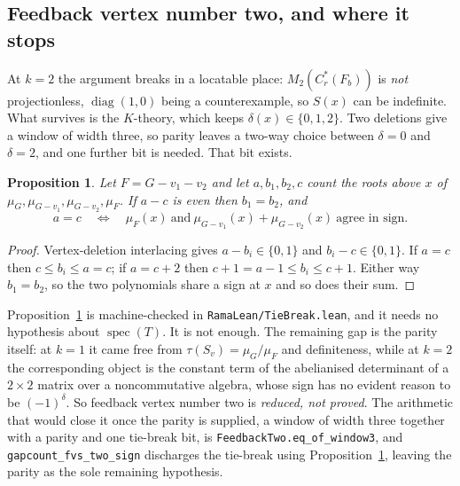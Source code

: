 \documentclass[11pt]{article}
\newtheorem{proposition}[theorem]{Proposition}
\theoremstyle{remark}
\begin{document}
\subsection{Feedback vertex number two, and where it stops}

At $k=2$ the argument breaks in a locatable place: $M_2(C^*_r(F_b))$ is \emph{not}
projectionless, $\operatorname{diag}(1,0)$ being a counterexample, so $S(x)$ can be
indefinite. What survives is the $K$-theory, which keeps $\delta(x)\in\{0,1,2\}$. Two
deletions give a window of width three, so parity leaves a two-way choice between
$\delta=0$ and $\delta=2$, and one further bit is needed. That bit exists.

\begin{proposition}\label{prop:tiebreak}
Let $F=G-v_1-v_2$ and let $a,b_1,b_2,c$ count the roots above $x$ of
$\mu_G,\mu_{G-v_1},\mu_{G-v_2},\mu_F$. If $a-c$ is even then $b_1=b_2$, and
\[
a=c\quad\Longleftrightarrow\quad \mu_F(x)\ \text{and}\ \mu_{G-v_1}(x)+\mu_{G-v_2}(x)\ \text{agree in sign}.
\]
\end{proposition}

\begin{proof}
Vertex-deletion interlacing gives $a-b_i\in\{0,1\}$ and $b_i-c\in\{0,1\}$. If $a=c$ then
$c\le b_i\le a=c$; if $a=c+2$ then $c+1=a-1\le b_i\le c+1$. Either way $b_1=b_2$, so the two
polynomials share a sign at $x$ and so does their sum.
\end{proof}

Proposition~\ref{prop:tiebreak} is machine-checked in \texttt{RamaLean/TieBreak.lean}, and it
needs no hypothesis about $\operatorname{spec}(T)$. It is not enough. The remaining gap is the
parity itself: at $k=1$ it came free from $\tau(S_v)=\mu_G/\mu_F$ and definiteness, while at
$k=2$ the corresponding object is the constant term of the abelianised determinant of a
$2\times2$ matrix over a noncommutative algebra, whose sign has no evident reason to be
$(-1)^{\delta}$. So feedback vertex number two is \emph{reduced, not proved}. The arithmetic
that would close it once the parity is supplied, a window of width three together with a
parity and one tie-break bit, is \texttt{FeedbackTwo.eq\_of\_window3}, and
\texttt{gapcount\_fvs\_two\_sign} discharges the tie-break using
Proposition~\ref{prop:tiebreak}, leaving the parity as the sole remaining hypothesis.
\end{document}

